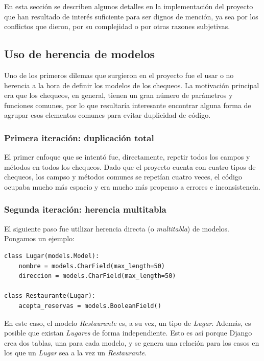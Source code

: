 En esta sección se describen algunos detalles en la implementación del proyecto
que han resultado de interés suficiente para ser dignos de mención, ya sea por
los conflictos que dieron, por su complejidad o por otras razones subjetivas.

\subsection{Uso de herencia de modelos}

Uno de los primeros dilemas que surgieron en el proyecto fue el usar o no
herencia a la hora de definir los modelos de los chequeos. La motivación
principal era que los chequeos, en general, tienen un gran número de parámetros
y funciones comunes, por lo que resultaría interesante encontrar alguna forma de
agrupar esos elementos comunes para evitar duplicidad de código.

\subsubsection{Primera iteración: duplicación total}

El primer enfoque que se intentó fue, directamente, repetir todos los campos y
métodos en todos los chequeos. Dado que el proyecto cuenta con cuatro tipos de
chequeos, los campso y métodos comunes se repetían cuatro veces, el código
ocupaba mucho más espacio y era mucho más propenso a errores e inconsistencia.

\subsubsection{Segunda iteración: herencia multitabla}

El siguiente paso fue utilizar herencia directa (o \textit{multitabla}) de
modelos. Pongamos un ejemplo:

\begin{verbatim}
class Lugar(models.Model):
    nombre = models.CharField(max_length=50)
    direccion = models.CharField(max_length=50)

class Restaurante(Lugar):
    acepta_reservas = models.BooleanField()
\end{verbatim}

En este caso, el modelo \textit{Restaurante} es, a su vez, un tipo de
\textit{Lugar}. Además, es posible que existan \textit{Lugares} de forma
independiente. Esto es así porque Django crea dos tablas, una para cada modelo,
y se genera una relación para los casos en los que un \textit{Lugar} sea a la
vez un \textit{Restaurante}.

